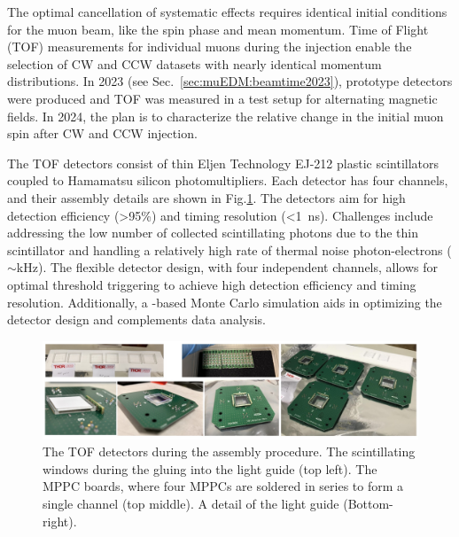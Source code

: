 \begin{refsection}
        \noindent
        The optimal cancellation of systematic effects requires identical initial conditions for the muon beam, like the spin phase and mean momentum. 
        Time of Flight (TOF) measurements for individual muons during the injection enable the selection of CW and CCW datasets with nearly identical momentum distributions. 
        In 2023 (see Sec.~\ref{sec:muEDM:beamtime2023}), prototype detectors were produced and TOF was measured in a test setup for alternating magnetic fields. 
        In 2024, the plan is to characterize the relative change in the initial muon spin after CW and CCW injection.

        \noindent
        The TOF detectors consist of thin Eljen Technology EJ-212 plastic scintillators coupled to Hamamatsu silicon photomultipliers. 
        Each detector has four channels, and their assembly details are shown in Fig.\ref{fig:muTOF_assemblyprocedure}. 
        The detectors aim for high detection efficiency (>95\%) and timing resolution (<\SI{1}{ns}). 
        Challenges include addressing the low number of collected scintillating photons due to the thin scintillator and handling a relatively high rate of thermal noise photon-electrons ($\sim$kHz). 
        The flexible detector design, with four independent channels, allows for optimal threshold triggering to achieve high detection efficiency and timing resolution.
        Additionally, a \gf-based Monte Carlo simulation aids in optimizing the detector design and complements data analysis.
        
        \begin{figure}
            \centering
            \includegraphics[width=16cm]{Figures/muEDM/muTOF_assembly.jpg}
            \caption[muEDM: Picture of the TOF detectors]{The TOF detectors during the assembly procedure. The scintillating windows during the gluing into the light guide (top left). The MPPC boards, where four MPPCs are soldered in series to form a single channel (top middle). A detail of the light guide (Bottom-right).}
        \label{fig:muTOF_assemblyprocedure}
        \end{figure}
        

\end{refsection}
